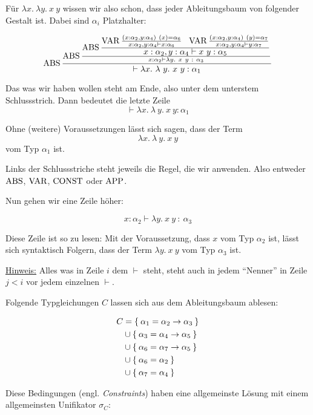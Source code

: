 Für $\lambda x.\ \lambda y.\ x\ y$ wissen wir also schon, dass jeder Ableitungsbaum
von folgender Gestalt ist. Dabei sind $\alpha_i$ Platzhalter:

\[\ABS \frac{\ABS\frac{\textstyle\ABS \frac{\textstyle\VAR \frac{(x: \alpha_2, y: \alpha_4)\ (x) = \alpha_6}{x: \alpha_2, y: \alpha_4 \vdash x: \alpha_6}\ \ \VAR \frac{(x:\alpha_2, y: \alpha_4)\ (y) = \alpha_7}{x: \alpha_2, y: \alpha_4 \vdash y : \alpha_7}}{\textstyle x: \alpha_2, y: \alpha_4 \vdash x\ y: \alpha_5}}{x:\alpha_2 \vdash \lambda y.\ x\ y\ :\ \alpha_3}}{\vdash \lambda x.\ \lambda \ y.\ x\ y: \alpha_1}\]

Das was wir haben wollen steht am Ende, also unter dem unterstem Schlussstrich.
Dann bedeutet die letzte Zeile 
\[\vdash \lambda x.\ \lambda \ y.\ x\ y: \alpha_1\]

Ohne (weitere) Voraussetzungen lässt sich sagen, dass der Term
\[\lambda x.\ \lambda \ y.\ x\ y\]
vom Typ $\alpha_1$ ist.

Links der Schlussstriche steht jeweils die Regel, die wir anwenden. Also entweder
$\operatorname{ABS}$, $\operatorname{VAR}$, $\operatorname{CONST}$ oder $\operatorname{APP}$.

Nun gehen wir eine Zeile höher:

\[x:\alpha_2 \vdash \lambda y.\ x\ y\ :\ \alpha_3\]

Diese Zeile ist so zu lesen: Mit der Voraussetzung, dass $x$ vom Typ $\alpha_2$
ist, lässt sich syntaktisch Folgern, dass der Term $\lambda y.\ x\ y$ vom
Typ $\alpha_3$ ist.

\underline{Hinweis:} Alles was in Zeile $i$ dem $\vdash$ steht, steht auch in 
jedem \enquote{Nenner} in Zeile $j < i$ vor jedem einzelnen $\vdash$.

Folgende Typgleichungen $C$ lassen sich aus dem Ableitungsbaum ablesen:

\begin{align*}
	C &= \Set{\alpha_1 = \alpha_2 \rightarrow \alpha_3}\\
	  &\cup \Set{\alpha_3 = \alpha_4 \rightarrow \alpha_5}\\
	  &\cup \Set{\alpha_6 = \alpha_7 \rightarrow \alpha_5}\\
	  &\cup \Set{\alpha_6 = \alpha_2}\\
	  &\cup \Set{\alpha_7 = \alpha_4}
\end{align*}

Diese Bedingungen (engl. \textit{Constraints}) haben eine
allgemeinste Lösung mit einem allgemeinsten Unifikator $\sigma_C$:

